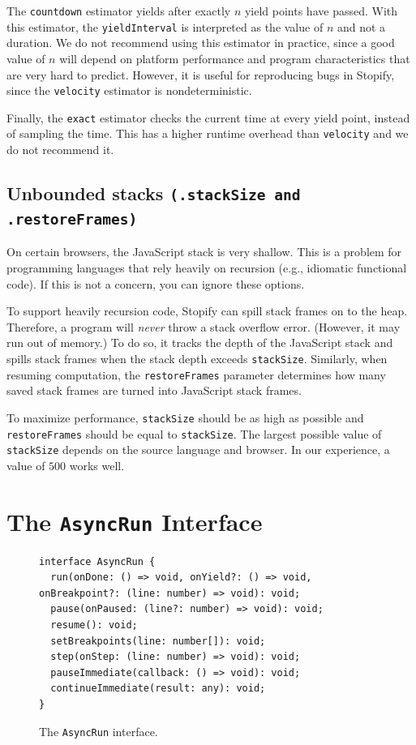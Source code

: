 \documentclass[10pt]{book}
\begin{document}
The \texttt{countdown} estimator yields after exactly $n$
yield points have passed. With this estimator, the \texttt{yieldInterval}
is interpreted as the value of $n$ and not a duration. We do not recommend
using this estimator in practice, since a good value of $n$ will depend on
platform performance and program characteristics that are very hard to
predict. However, it is useful for reproducing bugs in Stopify, since
the \texttt{velocity} estimator is nondeterministic.

Finally, the \texttt{exact} estimator checks the current time at every
yield point, instead of sampling the time. This has a higher runtime
overhead than \texttt{velocity} and we do not recommend it.

\subsection{Unbounded stacks \texttt{(.stackSize and .restoreFrames)}}

On certain browsers, the JavaScript stack is very shallow. This is a problem
for programming languages that rely heavily on recursion (e.g., idiomatic
functional code). If this is not a concern, you can ignore these options.

To support heavily recursion code, Stopify can spill stack frames on to the 
heap. Therefore, a program will \emph{never} throw a stack overflow error.
(However, it may run out of memory.) To do so, it tracks the depth of the
JavaScript stack and spills stack frames when the stack depth exceeds 
\lstinline|stackSize|. Similarly, when resuming computation, the 
\lstinline|restoreFrames| parameter determines how many saved stack frames
are turned into JavaScript stack frames.

To maximize performance, \lstinline|stackSize| should be as high as possible
and \lstinline|restoreFrames| should be equal to
\lstinline|stackSize|. The largest possible value of \lstinline|stackSize|
depends on the source language and browser. In our experience, a value of 
$500$ works well.

\section{The \texttt{AsyncRun} Interface\label{asyncrun}}
\lstset{language=js}

\begin{figure}
\lstset{language=js}
\begin{lstlisting}
interface AsyncRun {
  run(onDone: () => void, onYield?: () => void, onBreakpoint?: (line: number) => void): void;
  pause(onPaused: (line?: number) => void): void;
  resume(): void;
  setBreakpoints(line: number[]): void;
  step(onStep: (line: number) => void): void;
  pauseImmediate(callback: () => void): void;
  continueImmediate(result: any): void;
}
\end{lstlisting}
\caption{The \texttt{AsyncRun} interface.}
\label{asyncrun-interface}
\end{figure}
\end{document}
